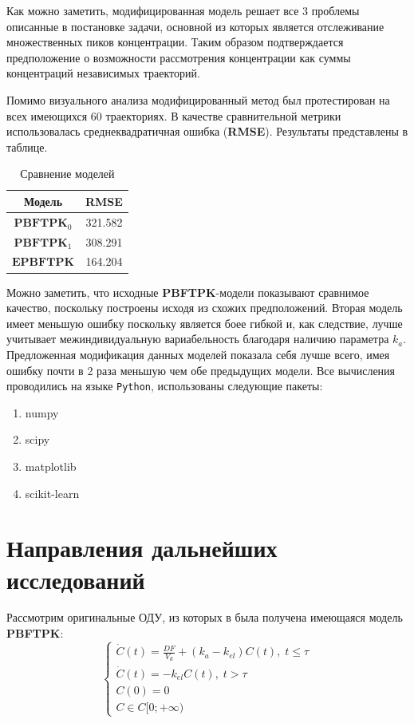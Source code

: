 \documentclass[oneside,senior,etd]{BYUPhys}
\begin{document}
Как можно заметить, модифицированная модель решает все 3 проблемы описанные в постановке задачи, основной из которых является отслеживание множественных пиков концентрации. Таким образом подтверждается предположение о возможности рассмотрения концентрации как суммы концентраций независимых траекторий.

\newpage \newpage

Помимо визуального анализа модифицированный метод был протестирован на всех имеющихся 60 траекториях. В качестве сравнительной метрики использовалась среднеквадратичная ошибка (\textbf{RMSE}). Результаты представлены в таблице.

\begin{table}[!h!]
	\centering
	\caption{Сравнение моделей}
	\begin{tabular}{|c|c|}
		\hline
		Модель              & RMSE    \\
		\hline
		$\textbf{PBFTPK}_0$ & 321.582 \\
		\hline
		$\textbf{PBFTPK}_1$ & 308.291 \\
		\hline
		$\textbf{EPBFTPK}$  & 164.204 \\
		\hline
	\end{tabular}
\end{table}

Можно заметить, что исходные \textbf{PBFTPK}-модели показывают сравнимое качество, поскольку построены исходя из схожих предположений. Вторая модель имеет меньшую ошибку поскольку является боее гибкой и, как следствие, лучше учитывает межиндивидуальную вариабельность благодаря наличию параметра $k_a$. Предложенная модификация данных моделей показала себя лучше всего, имея ошибку почти в 2 раза меньшую чем обе предыдущих модели. Все вычисления проводились на языке \texttt{Python}, использованы следующие пакеты:
\begin{enumerate}
	\item numpy
	\item scipy
	\item matplotlib
	\item scikit-learn
\end{enumerate}

\section{Направления дальнейших исследований}

Рассмотрим оригинальные ОДУ, из которых в \cite{pbftpk} была получена имеющаяся модель \textbf{PBFTPK}:
\[
	\label{ode}
	\begin{cases}
		\dot{C}(t) = \frac{D F}{V_d} + (k_a - k_{el}) C(t), \; t \le \tau \\
		\dot{C}(t) = - k_{el} C(t), \; t > \tau                           \\
		C(0) = 0                                                          \\
		C \in C[0; +\infty)
	\end{cases}
\]
\end{document}
